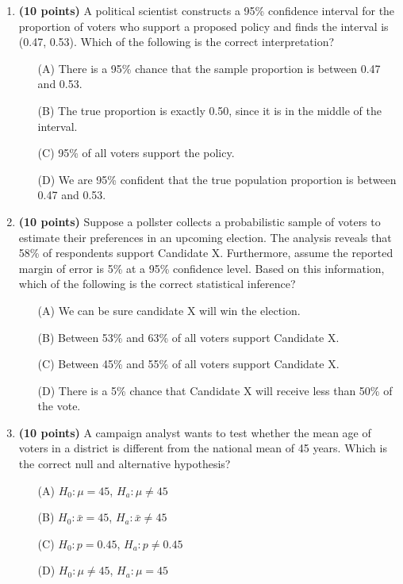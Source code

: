 \documentclass{article}
\newcommand{\blankbox}[2][3cm]{%
    \vspace{-0.5em}
    \begin{figure}[H]
        \makebox[\linewidth]{%
            \begin{tcolorbox}[
                colback=white, 
                colframe=white,  %
                width=#2, %
                height=#1,
                boxrule=0.2mm
            ]
            \end{tcolorbox}
        }
    \end{figure}
    \vspace{-2em}
}
\begin{document}
\begin{enumerate}
    \item \textbf{(10 points)}   A political scientist constructs a 95\% confidence interval for the proportion of voters who support a proposed policy and finds the interval is (0.47, 0.53). Which of the following is the correct interpretation?
    \begin{enumerate}
        \item[(A)] There is a 95\% chance that the sample proportion is between 0.47 and 0.53.
        \item[(B)] The true proportion is exactly 0.50, since it is in the middle of the interval.
        \item[(C)] 95\% of all voters support the policy.
        \item[(D)]  We are 95\% confident that the true population proportion is between 0.47 and 0.53.
    \end{enumerate} \blankbox[2cm]{1.0\linewidth}
    

    \item \textbf{(10 points)} Suppose a pollster collects a probabilistic sample of voters to estimate their preferences in an upcoming election. The analysis reveals that 58\% of respondents support Candidate X. Furthermore, assume the reported margin of error is 5\% at a 95\% confidence level. Based on this information, which of the following is the correct statistical inference?
    
    \begin{enumerate}
        \item[(A)] We can be sure candidate X will win the election.
        \item[(B)] Between 53\% and 63\% of all voters support Candidate X.
        \item[(C)] Between 45\% and 55\% of all voters support Candidate X.
        \item[(D)] There is a 5\% chance that Candidate X will receive less than 50\% of the vote.
    \end{enumerate}
    \blankbox[2cm]{1.0\linewidth}
    
    
    \item \textbf{(10 points)}   A campaign analyst wants to test whether the mean age of voters in a district is different from the national mean of 45 years. Which is the correct null and alternative hypothesis?
    \begin{enumerate}
        \item[(A)] $H_0: \mu = 45$, $H_a: \mu \neq 45$
        \item[(B)] $H_0: \bar{x} = 45$, $H_a: \bar{x} \neq 45$
        \item[(C)] $H_0: p = 0.45$, $H_a: p \neq 0.45$
        \item[(D)] $H_0: \mu \neq 45$, $H_a: \mu = 45$
    \end{enumerate} \blankbox[2cm]{1.0\linewidth}
    

\end{enumerate}
\end{document}
